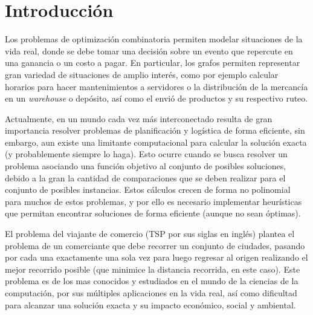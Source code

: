 \documentclass[10pt,a4paper]{article}
\begin{document}




\maketitle

\newpage

\tableofcontents
\newpage
\setcounter{page}{1}

\section{Introducción} 

Los problemas de optimización combinatoria permiten modelar situaciones de la vida real, donde se debe tomar una decisión sobre un evento que repercute en una ganancia o un costo a pagar. En particular, los grafos permiten representar gran variedad de situaciones de amplio interés, como por ejemplo calcular horarios para hacer mantenimientos a servidores o la distribución de la mercancía en un \emph{warehouse} o depósito, así como el envió de productos y su respectivo ruteo. 

Actualmente, en un mundo cada vez más interconectado resulta de gran importancia resolver problemas de planificación y logística de forma eficiente, sin embargo, aun existe una limitante computacional para calcular la solución exacta (y probablemente siempre lo haga). Esto ocurre cuando se busca resolver un problema asociando una función objetivo al conjunto de posibles soluciones, debido a la gran la cantidad de comparaciones que se deben realizar para el conjunto de posibles instancias. Estos cálculos crecen de forma no polinomial para muchos de estos problemas, y por ello es necesario implementar heurísticas que permitan encontrar soluciones de forma eficiente (aunque no sean óptimas).

El problema del viajante de comercio (TSP por sus siglas en inglés) plantea el problema de un comerciante que debe recorrer un conjunto de ciudades, pasando por cada una exactamente una sola vez para luego regresar al origen realizando el mejor recorrido posible (que minimice la distancia recorrida, en este caso). Este problema es de los mas conocidos y estudiados en el mundo de la ciencias de la computación, por sus múltiples aplicaciones en la vida real, así como dificultad para alcanzar una solución exacta y su impacto económico, social y ambiental. 
\end{document}
